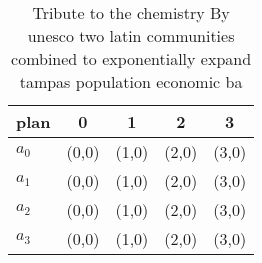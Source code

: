 \documentclass[a4paper]{article}
\begin{document}
\begin{table}
\begin{adjustbox}{width=0.7\columnwidth}
\begin{tabular}{|l|l|l|l|l|}
\hline
\textbf{plan} & \multicolumn{1}{c|}{\textbf{0}} & \multicolumn{1}{c|}{\textbf{1}} & \multicolumn{1}{c|}{\textbf{2}} & \multicolumn{1}{c|}{\textbf{3}} \\ \hline
\textbf{$a_0$}  & (0,0) & (1,0) & (2,0) & (3,0) \\ \hline
\textbf{$a_1$}  & (0,0) & (1,0) & (2,0) & (3,0) \\ \hline
\textbf{$a_2$}  & (0,0) & (1,0) & (2,0) & (3,0) \\ \hline
\textbf{$a_3$}  & (0,0) & (1,0) & (2,0) & (3,0) \\ \hline
\end{tabular}
\end{adjustbox}
\caption{Tribute to the chemistry By unesco two latin communities combined to exponentially expand tampas population economic ba
}
\end{table}
\end{document}
